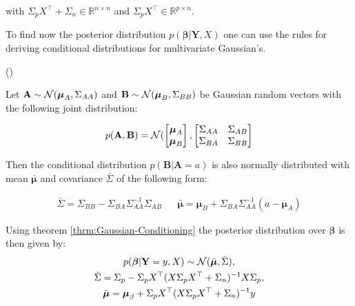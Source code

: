 with $\Sigma_p X^{\top} + \Sigma_n \in \mathbb{R}^{n\times n}$ and $\Sigma_p X^{\top} \in \mathbb{R}^{p\times n}$.

To find now the posterior distribution $p(\boldsymbol{\beta} | \mathbf{Y}, X)$ one can use the rules for deriving conditional
distributions for multivariate Gaussian's.

\begin{theorem}\label{thrm:Gaussian-Conditioning} (\citeauthor{von_mises_mathematical_1964})

Let $\mathbf{A} \sim \operatorname{\mathcal{N}}(\boldsymbol{\mu}_A, \Sigma_{AA})$ and $\mathbf{B} \sim \operatorname{\mathcal{N}}(\boldsymbol{\mu}_B, \Sigma_{BB})$ be
Gaussian random vectors with the following joint distribution:

\begin{gather}
    p(\mathbf{A}, \mathbf{B}) = \operatorname{\mathcal{N}}(
    \begin{bmatrix}
        \boldsymbol{\mu}_A \\
        \boldsymbol{\mu}_B
    \end{bmatrix},
    \begin{bmatrix}
        \Sigma_{AA} & \Sigma_{AB} \\
        \Sigma_{BA} & \Sigma_{BB}
    \end{bmatrix}
\end{gather}

Then the conditional distribution $p(\mathbf{B} | \mathbf{A}=a)$ is also normally distributed
with mean $\bar{\boldsymbol{\mu}}$ and covariance $\bar{\Sigma}$ of the following form:

\begin{align}
    \bar{\Sigma} = \Sigma_{B B} - \Sigma_{B A} \Sigma_{A A}^{-1} \Sigma_{A B} & & \bar{\boldsymbol{\mu}} = \boldsymbol{\mu}_{B} + \Sigma_{BA} \Sigma_{AA}^{-1}(a - \boldsymbol{\mu}_A)
\end{align}
\end{theorem}

Using theorem \ref{thrm:Gaussian-Conditioning} the posterior distribution over $\boldsymbol{\beta}$ is then given by:
\begin{gather*}
    p(\boldsymbol{\beta} | \mathbf{Y}=y, X) \sim \operatorname{\mathcal{N}}(\bar{\boldsymbol{\mu}}, \bar{\Sigma}), \\
    \bar{\Sigma} = \Sigma_{p} - \Sigma_p X^{\top}(X \Sigma_p X^{\top} + \Sigma_n)^{-1} X  \Sigma_p, \\
    \bar{\boldsymbol{\mu}} = \boldsymbol{\mu}_{\beta} + \Sigma_p X^{\top}(X \Sigma_p X^{\top} + \Sigma_n)^{-1}y
\end{gather*}

